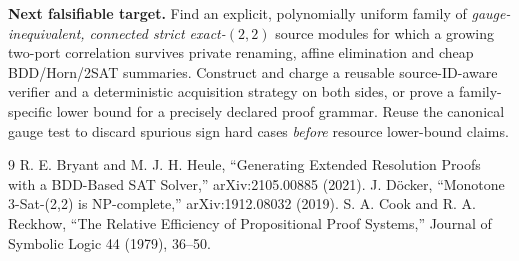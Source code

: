 \documentclass[11pt]{article}
\begin{document}
\noindent\textbf{Next falsifiable target.} Find an explicit, polynomially uniform family of \emph{gauge-inequivalent, connected strict exact-$(2,2)$} source modules for which a growing two-port correlation survives private renaming, affine elimination and cheap BDD/Horn/2SAT summaries. Construct and charge a reusable source-ID-aware verifier and a deterministic acquisition strategy on both sides, or prove a family-specific lower bound for a precisely declared proof grammar. Reuse the canonical gauge test to discard spurious sign hard cases \emph{before} resource lower-bound claims.

\begin{thebibliography}{9}
 R. E. Bryant and M. J. H. Heule, ``Generating Extended Resolution Proofs with a BDD-Based SAT Solver,'' arXiv:2105.00885 (2021).
 J. D\"ocker, ``Monotone 3-Sat-(2,2) is NP-complete,'' arXiv:1912.08032 (2019).
 S. A. Cook and R. A. Reckhow, ``The Relative Efficiency of Propositional Proof Systems,'' Journal of Symbolic Logic 44 (1979), 36--50.
\end{thebibliography}
\end{document}
